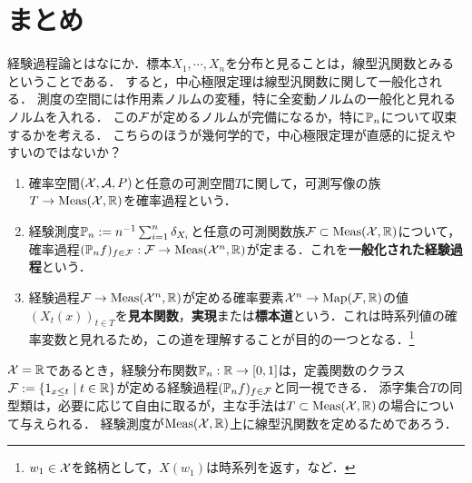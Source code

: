 \documentclass[uplatex,dvipdfmx]{jsreport}
\begin{document}
\section{まとめ}

\begin{tcolorbox}[colframe=ForestGreen, colback=ForestGreen!10!white,breakable,colbacktitle=ForestGreen!40!white,coltitle=black,fonttitle=\bfseries\sffamily,
title=経験過程論]
    経験過程論とはなにか．標本$X_1,\cdots,X_n$を分布と見ることは，線型汎関数とみるということである．
    すると，中心極限定理は線型汎関数に関して一般化される．
    測度の空間には作用素ノルムの変種，特に全変動ノルムの一般化と見れるノルムを入れる．
    この$\mathcal{F}$が定めるノルムが完備になるか，特に$\mathbb{P}_n$について収束するかを考える．
    こちらのほうが幾何学的で，中心極限定理が直感的に捉えやすいのではないか？
\end{tcolorbox}

\begin{definition}\mbox{}
    \begin{enumerate}
        \item 確率空間$(\mathcal{X},\mathcal{A},P)$と任意の可測空間$T$に関して，可測写像の族$T\to\mathrm{Meas}(\mathcal{X},\mathbb{R})$を確率過程という．
        \item 経験測度$\mathbb{P}_n:=n^{-1}\sum_{i=1}^n\delta_{X_i}$と任意の可測関数族$\mathcal{F}\subset\mathrm{Meas}(\mathcal{X},\mathbb{R})$について，確率過程$(\mathbb{P}_nf)_{f\in\mathcal{F}}:\mathcal{F}\to\mathrm{Meas}(\mathcal{X}^n,\mathbb{R})$が定まる．これを\textbf{一般化された経験過程}という．
        \item 経験過程$\mathcal{F}\to\mathrm{Meas}(\mathcal{X}^n,\mathbb{R})$が定める確率要素$\mathcal{X}^n\to\mathrm{Map}(\mathcal{F},\mathbb{R})$の値$(X_t(x))_{t\in T}$を\textbf{見本関数}，\textbf{実現}または\textbf{標本道}という．これは時系列値の確率変数と見れるため，この道を理解することが目的の一つとなる．\footnote{$w_1\in\mathcal{X}$を銘柄として，$X(w_1)$は時系列を返す，など．}
    \end{enumerate}
\end{definition}
\begin{remarks}
    $\mathcal{X}=\mathbb{R}$であるとき，経験分布関数$\mathbb{F}_n:\mathbb{R}\to[0,1]$は，定義関数のクラス$\mathcal{F}:=\left\{1_{x\le t}\mid t\in\mathbb{R}\right\}$が定める経験過程$(\mathbb{P}_nf)_{f\in\mathcal{F}}$と同一視できる．
    添字集合$T$の同型類は，必要に応じて自由に取るが，主な手法は$T\subset\mathrm{Meas}(\mathcal{X},\mathbb{R})$の場合について与えられる．
    経験測度が$\mathrm{Meas}(\mathcal{X},\mathbb{R})$上に線型汎関数を定めるためであろう．
\end{remarks}
\end{document}
